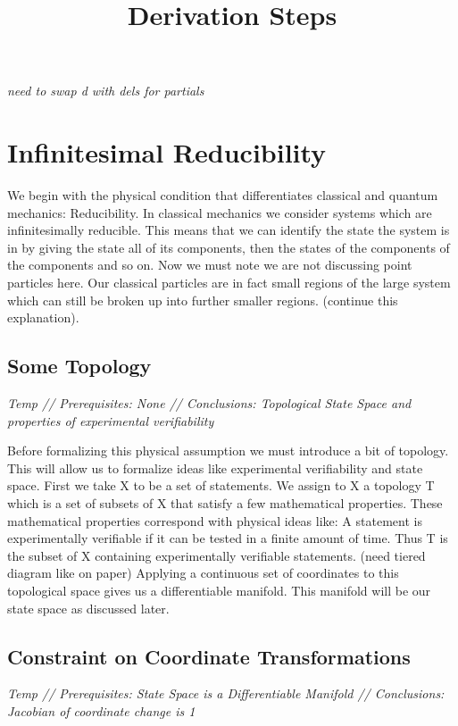 \documentclass{article}
\begin{document}
\title{Derivation Steps}
\textsl{need to swap d with dels for partials}

\section{Infinitesimal Reducibility}

	We begin with the physical condition that differentiates classical and quantum mechanics: Reducibility. In classical mechanics we consider systems which are infinitesimally reducible. This means that we can identify the state the system is in by giving the state all of its components, then the states of the components of the components and so on. Now we must note we are not discussing point particles here. Our classical particles are in fact small regions of the large system which can still be broken up into further smaller regions. (continue this explanation). 
	
\subsection{Some Topology}
\textsl{Temp // Prerequisites: None // Conclusions: Topological State Space and properties of experimental verifiability}

	Before formalizing this physical assumption we must introduce a bit of topology. This will allow us to formalize ideas like experimental verifiability and state space. First we take X to be a set of statements. We assign to X a topology T which is a set of subsets of X that satisfy a few mathematical properties. These mathematical properties correspond with physical ideas like: A statement is experimentally verifiable if it can be tested in a finite amount of time. Thus T is the subset of X containing experimentally verifiable statements. (need tiered diagram like on paper) Applying a continuous set of coordinates to this topological space gives us a differentiable manifold. This manifold will be our state space as discussed later.
	
\subsection{Constraint on Coordinate Transformations}
\textsl{Temp // Prerequisites: State Space is a Differentiable Manifold // Conclusions: Jacobian of coordinate change is 1}
\end{document}
